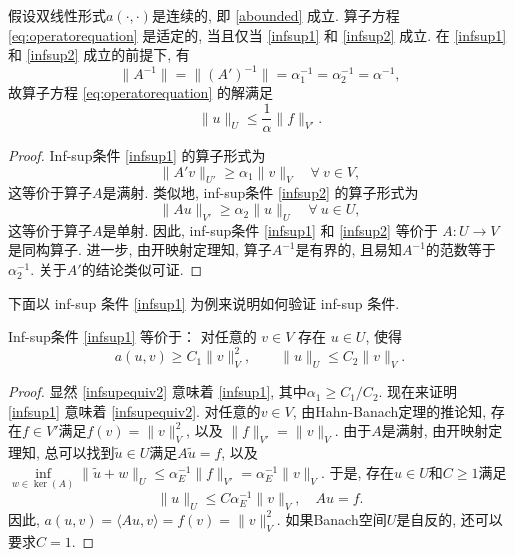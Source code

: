 \begin{theorem}
假设双线性形式$a(\cdot, \cdot)$是连续的, 即 \eqref{abounded} 成立. 算子方程 \eqref{eq:operatorequation} 是适定的, 当且仅当 \eqref{infsup1} 和 \eqref{infsup2} 成立. 在 \eqref{infsup1} 和 \eqref{infsup2} 成立的前提下, 有
\[
\|A^{-1}\|=\|(A')^{-1}\|=\alpha_{1}^{-1}=\alpha_{2}^{-1}=\alpha^{-1},
\]
故算子方程 \eqref{eq:operatorequation} 的解满足
\[
\|u\|_U\leq\frac{1}{\alpha}\|f\|_{V'}.
\]
\end{theorem}
\begin{proof}
Inf-sup条件 \eqref{infsup1} 的算子形式为 
$$
\|A'v\|_{U'}\geq \alpha_1\|v\|_V\quad \forall~v\in V,
$$
这等价于算子$A$是满射. 类似地, inf-sup条件 \eqref{infsup2} 的算子形式为
$$
\|Au\|_{V'}\geq \alpha_2\|u\|_U\quad \forall~u\in U,
$$ 
这等价于算子$A$是单射. 因此, inf-sup条件 \eqref{infsup1} 和 \eqref{infsup2} 等价于
$A : U\to V$是同构算子. 进一步, 由开映射定理知, 算子$A^{-1}$是有界的,  且易知$A^{-1}$的范数等于$\alpha_{2}^{-1}$. 关于$A'$的结论类似可证.
\end{proof}

下面以 inf-sup 条件 \eqref{infsup1} 为例来说明如何验证 inf-sup 条件. 
\begin{theorem}\label{thm:infsupequiv2}
Inf-sup条件 \eqref{infsup1} 等价于： 对任意的 $v\in V$ 存在
$u\in U$, 使得
\begin{equation}\label{infsupequiv2}
a(u, v)\geq C_1\|v\|_V^2,\quad\quad \|u\|_U\leq C_2\|v\|_V.
\end{equation}
\end{theorem}
\begin{proof}
显然 \eqref{infsupequiv2} 意味着 \eqref{infsup1}, 其中$\alpha_1\geq C_1/C_2$. 现在来证明 \eqref{infsup1} 意味着 \eqref{infsupequiv2}. 对任意的$v\in V$, 由Hahn-Banach定理的推论知, 存在$f\in V'$满足$f(v) =\|v\|_V^2$, 以及 $\|f\|_{V'} = \|v\|_V$. 由于$A$是满射, 由开映射定理知, 总可以找到$\tilde u\in U$满足$A\tilde u = f$, 以及 $\inf\limits_{w\in\ker(A)}\|\tilde u+w\|_U\leq\alpha_E^{-1}\|f\|_{V'}=\alpha_E^{-1}\|v\|_V$. 于是, 存在$u\in U$和$C\geq1$满足
\[
\|u\|_U\leq C\alpha_E^{-1}\|v\|_V, \quad  Au=f.
\]
因此, $a(u, v)=\langle Au, v\rangle=f(v)=\|v\|_V^2$. 如果Banach空间$U$是自反的, 还可以要求$C=1$.
\end{proof}

